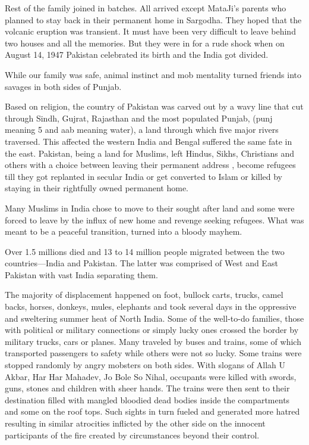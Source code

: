 Rest of the family joined in batches. All arrived except MataJi's parents who planned to stay back in their permanent home in Sargodha. They hoped that the volcanic eruption was transient. It must have been very difficult to leave behind two houses and all the memories. But they were in for a rude shock when on August 14, 1947 Pakistan celebrated its birth and the India got divided. 

While our family was safe, animal instinct and mob mentality turned friends into savages in both sides of Punjab. 

Based on religion, the country of Pakistan was carved out by a wavy line that cut through Sindh, Gujrat, Rajasthan and the most populated Punjab, (punj meaning 5 and aab meaning water), a land through which five major rivers traversed. This affected the western India and Bengal suffered the same fate in the east.  Pakistan, being a land for Muslims, left Hindus, Sikhs, Christians and others with a choice between leaving their permanent address , become refugees till they got replanted in secular India or get converted to Islam or killed by staying in their rightfully owned permanent home. 

Many Muslims in India chose to move to their sought after land and some were forced to leave by the influx of new home and revenge seeking refugees. What was meant to be a peaceful transition, turned into a bloody mayhem.

Over 1.5 millions died and 13 to 14 million people migrated between the two countries—India and Pakistan. The latter was comprised of West and East Pakistan with vast India separating them. 

The majority of displacement happened on foot, bullock carts, trucks, camel backs, horses, donkeys, mules, elephants and took several days in the oppressive and sweltering summer heat of North India. Some of the well-to-do families, those with political or military connections or simply lucky ones crossed the border by military trucks, cars or planes.  Many traveled by buses and trains, some of which transported passengers to safety while others were not so lucky. Some trains were stopped randomly by angry mobsters on both sides. With slogans of Allah U Akbar, Har Har Mahadev, Jo Bole So Nihal, occupants were killed with swords, guns, stones and children with sheer hands. The trains were then sent to their destination filled with mangled bloodied dead bodies inside the compartments and some on the roof tops. Such sights in turn fueled and generated more hatred resulting in similar atrocities inflicted by the other side on the innocent participants of the fire created by circumstances beyond their control.

